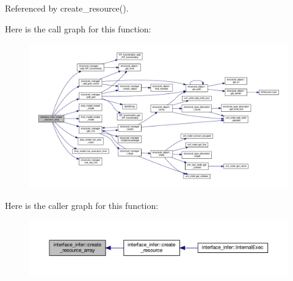 Referenced by create\+\_\+resource().

Here is the call graph for this function\+:
\nopagebreak
\begin{figure}[H]
\begin{center}
\leavevmode
\includegraphics[width=350pt]{d9/d8a/classinterface__infer_a0bff55a66fa24a9b18c1aadd1c224f87_cgraph}
\end{center}
\end{figure}
Here is the caller graph for this function\+:
\nopagebreak
\begin{figure}[H]
\begin{center}
\leavevmode
\includegraphics[width=350pt]{d9/d8a/classinterface__infer_a0bff55a66fa24a9b18c1aadd1c224f87_icgraph}
\end{center}
\end{figure}
\mbox{\label{classinterface__infer_a1b660bd8340d00695b5b8163edabe9f2}} 
